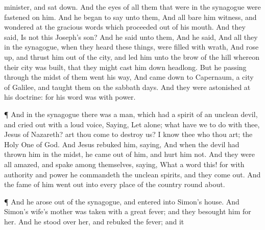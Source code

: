 {minister, and sat
down.
And the
eyes of all
them that
were
in the
synagogue were
fastened on
him.
And he
began to
say
unto
them,
{}
And
all
bare
him
witness,
and
wondered
at
the
gracious
words
which
proceeded out
of
his
mouth.
And they
said,
Is
not
this
Joseph’s
son?
And he
said
unto
them,
{}
And he
said,
{}
And all
they
in the
synagogue, when they
heard these
things, were
filled with
wrath,
And rose
up, and
thrust
him out
of the
city,
and
led
him
unto the
brow of the
hill
whereon
their
city was
built,
that they might
cast
him down
headlong.
But
he
passing
through the
midst of
them went his
way,
And came
down
to
Capernaum, a
city of
Galilee,
and
taught
them
on the sabbath
days.
And they were
astonished
at
his
doctrine:
for
his
word
was
with
power.
\par }{\PP {}¶
And
in the
synagogue there
was a
man, which
had a
spirit of an
unclean
devil,
and cried
out with a
loud
voice,
Saying,
Let
{}
alone;
what have we to
do with
thee,
{}
Jesus of
Nazareth? art thou
come to
destroy
us? I
know
thee
who thou
art; the Holy
One of
God.
And
Jesus
rebuked
him,
saying,
{} And
when the
devil had
thrown
him
in the
midst, he
came out
of
him, and
hurt
him
not.
And they
were
all
amazed,
and
spake
among
themselves,
saying,
What a
word
{}
this!
for
with
authority
and
power he
commandeth the
unclean
spirits,
and they come
out.
And the
fame
of
him went
out
into
every
place of the country round
about.
\par }{\PP {}¶
And he
arose out
of the
synagogue, and
entered
into
Simon’s
house.
And
Simon’s
wife’s mother
was taken
with a
great
fever;
and they
besought
him
for
her.
And he
stood
over
her, and
rebuked the
fever;
and it
}

